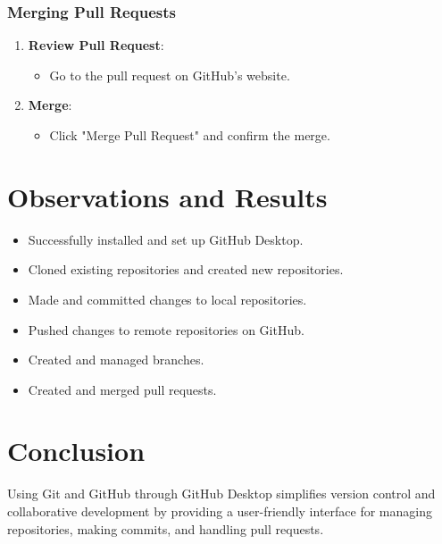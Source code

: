 \subsubsection{Merging Pull Requests}

\begin{enumerate}
    \item \textbf{Review Pull Request}:
    \begin{itemize}
        \item Go to the pull request on GitHub’s website.
    \end{itemize}

    \item \textbf{Merge}:
    \begin{itemize}
        \item Click "Merge Pull Request" and confirm the merge.
    \end{itemize}
\end{enumerate}

\section{Observations and Results}

\begin{itemize}
    \item Successfully installed and set up GitHub Desktop.
    \item Cloned existing repositories and created new repositories.
    \item Made and committed changes to local repositories.
    \item Pushed changes to remote repositories on GitHub.
    \item Created and managed branches.
    \item Created and merged pull requests.
\end{itemize}

\section{Conclusion}

Using Git and GitHub through GitHub Desktop simplifies version control and collaborative development by providing a user-friendly interface for managing repositories, making commits, and handling pull requests.

